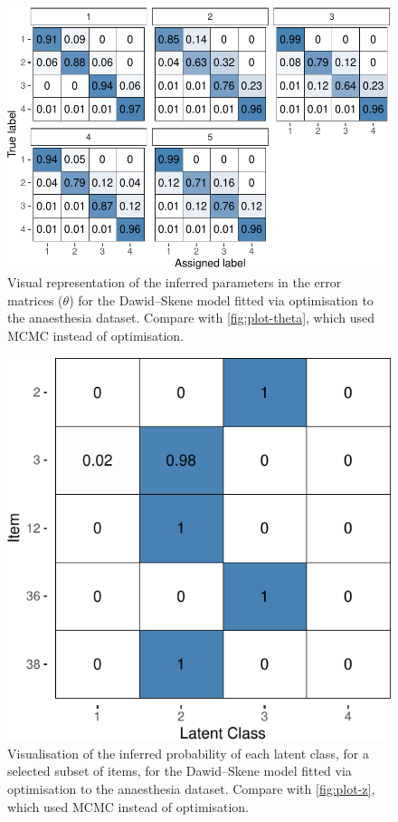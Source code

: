 \begin{figure}

{\centering \includegraphics{RJ-2023-064_files/figure-latex/plot-theta-fit2-1} 

}

\caption{Visual representation of the inferred parameters in the error matrices ($\theta$) for the Dawid--Skene model fitted via optimisation to the anaesthesia dataset.  Compare with \autoref{fig:plot-theta}, which used MCMC instead of optimisation.}\label{fig:plot-theta-fit2}
\end{figure}

\begin{figure}

{\centering \includegraphics{RJ-2023-064_files/figure-latex/plot-z-fit2-1} 

}

\caption{Visualisation of the inferred probability of each latent class, for a selected subset of items, for the Dawid--Skene model fitted via optimisation to the anaesthesia dataset.  Compare with \autoref{fig:plot-z}, which used MCMC instead of optimisation.}\label{fig:plot-z-fit2}
\end{figure}

